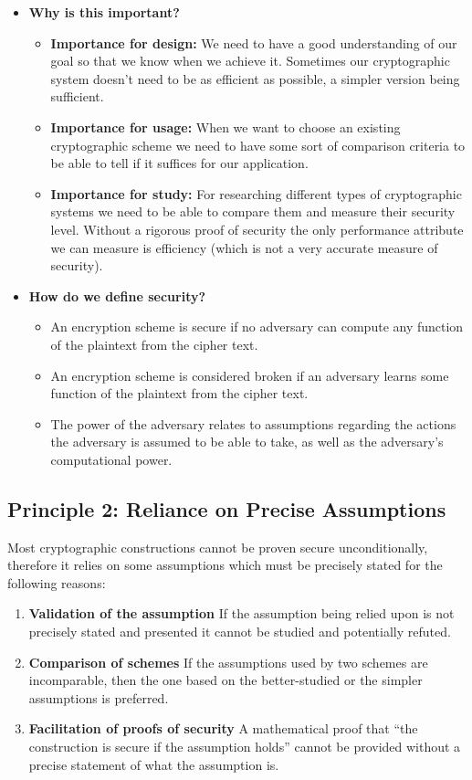 \begin{itemize}
    \item \textbf{Why is this important?}
    \begin{itemize}
        \item \textbf{Importance for design:} We need to have a good understanding of our goal so that
we know when we achieve it. Sometimes our cryptographic system doesn't need to
be as efficient as possible, a simpler version being sufficient.
        \item \textbf{Importance for usage:} When we want to choose an existing cryptographic scheme
we need to have some sort of comparison criteria to be able to tell if it suffices for our
application.
        \item \textbf{Importance for study:} For researching different types of cryptographic systems
we need to be able to compare them and measure their security level. Without
a rigorous proof of security the only performance attribute we can measure is
efficiency (which is not a very accurate measure of security).
    \end{itemize}
    \item \textbf{How do we define security?}
    \begin{itemize}
        \item An encryption scheme is secure if no adversary can compute any function of the
plaintext from the cipher text.
        \item An encryption scheme is considered broken if an adversary learns some function of
the plaintext from the cipher text.
        \item The power of the adversary relates to assumptions regarding the actions the
adversary is assumed to be able to take, as well as the adversary's computational
power.
    \end{itemize}
\end{itemize}

\subsection{Principle 2: Reliance on Precise Assumptions}

Most cryptographic constructions cannot be proven secure unconditionally, therefore it relies on some assumptions which must be precisely stated for the following reasons:

\begin{enumerate}
\item \textbf{Validation of the assumption} If the assumption being relied upon is not precisely stated and presented it cannot be studied and potentially refuted.
\item \textbf{Comparison of schemes} If the assumptions used by two schemes are incomparable, then the one based on the better-studied or the simpler assumptions is preferred.
\item \textbf{Facilitation of proofs of security} A mathematical proof that ``the construction is secure if the assumption holds'' cannot be provided without a precise statement of what the assumption is.
\end{enumerate}

